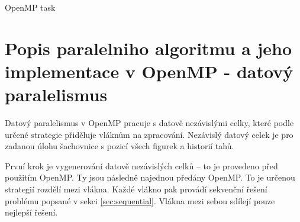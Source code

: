 \documentclass{article}
\begin{document}
    \begin{algorithm}[H]
        \SetAlgoLined
        \DontPrintSemicolon

        \;
        \caption{OpenMP task}
        \label{alg:openmp-task}
    \end{algorithm}


    \label{sec:data-par}
    \section{Popis paralelniho algoritmu a jeho implementace v OpenMP - datový paralelismus}
    Datový paralelismus v OpenMP pracuje s datově nezávislými celky, které podle určené
    strategie přiděluje vláknům na zpracování. Nezávislý datový celek je pro zadanou úlohu
    šachovnice s pozicí všech figurek a historií tahů.

    První krok je vygenerování datově nezávislých celků – to je provedeno před použitím OpenMP.
    Ty jsou následně najednou předány OpenMP. To je určenou strategií rozdělí mezi vlákna.
    Každé vlákno pak provádí sekvenční řešení problému popsané v sekci \ref{sec:sequential}.
    Vlákna mezi sebou sdílejí pouze nejlepší řešení.
\end{document}
